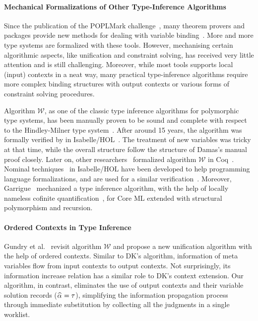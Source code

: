 \paragraph{Mechanical Formalizations of Other Type-Inference Algorithms}
Since the publication of the {\sc POPLMark} challenge~\cite{aydemir2005mechanized},
many theorem provers and packages provide new methods for dealing
with variable binding~\cite{aydemir2008engineering,urban2008nominalTech,chlipala2008parametric}.
More and more type systems are formalized with these tools.
However, mechanising certain algorithmic aspects, like unification and
constraint solving, has received very little attention and is still challenging.
Moreover, while most tools supports local (input) contexts in a neat way,
many practical type-inference algorithms require
more complex binding structures with output contexts or various forms of constraint solving procedures.

Algorithm $\mathcal{W}$,
as one of the classic type inference algorithms for polymorphic type systems,
has been manually proven to be sound and complete
with respect to the Hindley-Milner type system~\cite{hindley1969principal,milner1978theory,damas1982principal}.
After around 15 years, the algorithm was formally verified by
\citet{naraschewski1999type} in Isabelle/HOL~\cite{nipkow2002isabelle}.
The treatment of new variables was tricky at that time, while the overall structure follow the
structure of Damas's manual proof closely.
Later on, other researchers~\cite{dubois2000proving,dubois1999certification}
formalized algorithm $\mathcal{W}$ in Coq~\cite{Coq}.
Nominal techniques~\cite{urban2008nominalTech} in Isabelle/HOL have been
developed to help programming language formalizations, and are used for a similar
verification~\cite{urban2008nominal}. Moreover, Garrigue~\cite{garrigue2015certified}
mechanized a type inference algorithm,
with the help of locally nameless cofinite quantification~\cite{LocallyNameless},
for Core ML extended with structural polymorphism and recursion.

\paragraph{Ordered Contexts in Type Inference}
Gundry et al.~\cite{gundry2010type} revisit algorithm $\mathcal{W}$ and
propose a new unification algorithm with the help of ordered contexts.
Similar to DK's algorithm, information of meta variables flow from input contexts to output contexts.
Not surprisingly, its information increase relation has a similar role to DK's context extension.
Our algorithm, in contrast,
eliminates the use of output contexts and their variable solution records ($\al = \tau$),
simplifying the information propagation process through immediate substitution
by collecting all the judgments in a single worklist.

